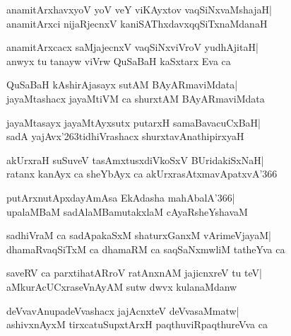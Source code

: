 \documentclass[twoside,12pt,openright]{book}
\def\S{\char'263}
\newcounter{shloka}[chapter]
\begin{document}
\begin{shloka}%
anamitArxhavxyoV yoV veY viKAyxtov vaqSiNxvaMshajaH|\\
anamitArxci nijaRjecnxV kaniSAThxdavxqqSiTxnaMdanaH
\end{shloka}

\begin{shloka}%
anamitArxcacx saMjajecnxV vaqSiNxviVroV yudhAjitaH|\\
anwyx tu tanayw viVrw QuSaBaH kaSxtarx Eva ca
\end{shloka}

\begin{shloka}%
QuSaBaH kAshirAjasayx sutAM BAyARmaviMdata|\\
jayaMtashacx jayaMtiVM ca shurxtAM BAyARmaviMdata
\end{shloka}

\begin{shloka}%
jayaMtasayx jayaMtAyxsutx putarxH samaBavacuCxBaH|\\
sadA yajAvx\S tidhiVrashacx shurxtavAnathipirxyaH
\end{shloka}

\begin{shloka}%
akUrxraH suSuveV tasAmxtusxdiVkoSxV BUridakiSxNaH|\\
ratanx kanAyx ca sheYbAyx ca akUrxrasAtxmavApatxvA\char'366
\end{shloka}

\begin{shloka}%
putArxnutApxdayAmAsa EkAdasha mahAbalA\char'366|\\
upalaMBaM sadAlaMBamutakxlaM cAyaRsheYshavaM
\end{shloka}

\begin{shloka}%
sadhiVraM ca sadApakaSxM shaturxGanxM vArimeVjayaM|\\
dhamaRvaqSiTxM ca dhamaRM ca saqSaNxmwliM tatheYva ca
\end{shloka}

\begin{shloka}%
saveRV ca parxtihatARroV ratAnxnAM jajicnxreV tu teV|\\
aMkurAcUCxraseVnAyAM sutw dwvx kulanaMdanw
\end{shloka}

\begin{shloka}%
deVvavAnupadeVvashacx jajAcnxteV deVvasaMmatw|\\
ashivxnAyxM tirxcatuSupxtArxH paqthuviRpaqthureVva ca
\end{shloka}
\end{document}
